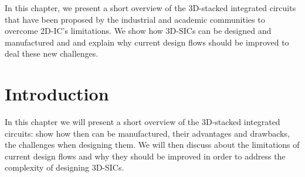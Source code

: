 \label{cha:rol.icdesign}

\begin{summary}
In this chapter, we present a short overview of the 3D-stacked integrated circuits that have been proposed by the industrial and academic communities to overcome 2D-IC's limitations. We show how 3D-SICs can be designed and manufactured and and explain why current design flows should be improved to deal these new challenges.
\end{summary}

\section{Introduction}
In this chapter we will present a short overview of the 3D-stacked integrated circuits: show how then can be manufactured, their advantages and drawbacks, the challenges when designing them. We will then discuss about the limitations of current design flows and why they should be improved in order to address the complexity of designing 3D-SICs.
%
%
%
%
